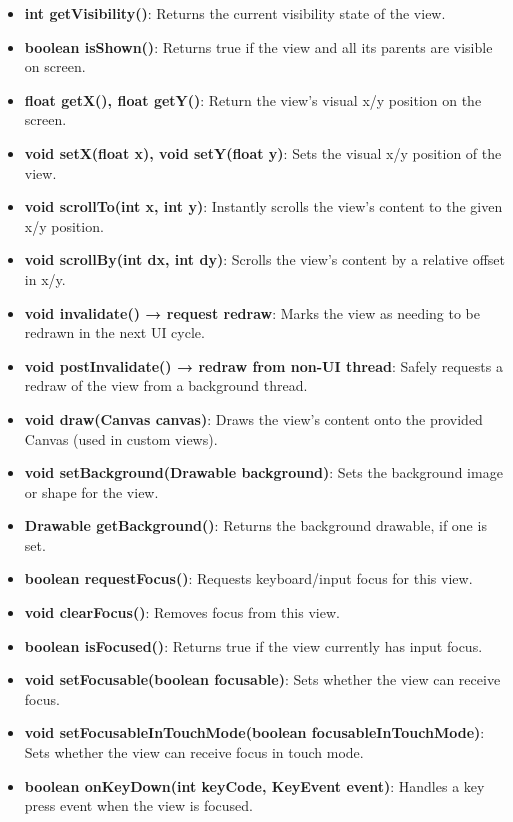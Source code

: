 \documentclass{report}
\begin{document}
\begin{itemize}
\begin{itemize}
                \item \textbf{int getVisibility()}: Returns the current visibility state of the view.
                \item \textbf{boolean isShown()}: Returns true if the view and all its parents are visible on screen.
                \item \textbf{float getX(), float getY()}: Return the view’s visual x/y position on the screen.
                \item \textbf{void setX(float x), void setY(float y)}: Sets the visual x/y position of the view.
                \item \textbf{void scrollTo(int x, int y)}: Instantly scrolls the view’s content to the given x/y position.
                \item \textbf{void scrollBy(int dx, int dy)}: Scrolls the view’s content by a relative offset in x/y.
                \item \textbf{void invalidate() → request redraw}: Marks the view as needing to be redrawn in the next UI cycle.
                \item \textbf{void postInvalidate() → redraw from non-UI thread}: Safely requests a redraw of the view from a background thread.
                \item \textbf{void draw(Canvas canvas)}: Draws the view’s content onto the provided Canvas (used in custom views).
                \item \textbf{void setBackground(Drawable background)}: Sets the background image or shape for the view.
                \item \textbf{Drawable getBackground()}: Returns the background drawable, if one is set.
                \item \textbf{boolean requestFocus()}: Requests keyboard/input focus for this view.
                \item \textbf{void clearFocus()}: Removes focus from this view.
                \item \textbf{boolean isFocused()}: Returns true if the view currently has input focus.
                \item \textbf{void setFocusable(boolean focusable)}: Sets whether the view can receive focus.
                \item \textbf{void setFocusableInTouchMode(boolean focusableInTouchMode)}: Sets whether the view can receive focus in touch mode.
                \item \textbf{boolean onKeyDown(int keyCode, KeyEvent event)}: Handles a key press event when the view is focused.

\end{itemize}
\end{itemize}
\end{document}
